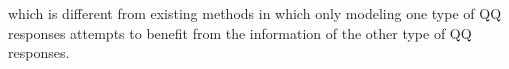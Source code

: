 \documentclass[12pt]{article}
\begin{document}
which is different from existing methods in which only modeling one type of QQ responses attempts to benefit from the information of the other type of QQ responses.
%
\end{document}
